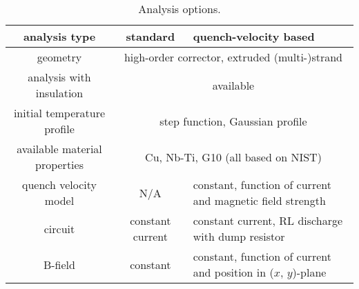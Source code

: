 \begin{table}[H]
    \caption{Analysis options.} 
    \vspace{-1.em} 
    \fontsize{10}{10}
    \selectfont 
    \renewcommand{\arraystretch}{1.5}
    \begin{center}
        \begin{tabular}{ | c | c | m{5cm} | }  
        \hline
        \textbf{analysis type} & \textbf{standard} & \textbf{quench-velocity based} \\
        \hline
        geometry & \multicolumn{2}{c|}{high-order corrector, extruded (multi-)strand} \\
        \hline
        analysis with insulation & \multicolumn{2}{c|}{available} \\
        \hline
        initial temperature profile & \multicolumn{2}{c|}{step function, Gaussian profile} \\
        \hline
        available material properties & \multicolumn{2}{c|}{Cu, Nb-Ti, G10 (all based on NIST)} \\
        \hline
        quench velocity model & N/A & constant, function of current and magnetic field strength \\
        \hline
        circuit & constant current & constant current, RL discharge with dump resistor \\ 
        \hline
        B-field & constant & constant, function of current and position in ($x$, $y$)-plane \\
        \hline
        \end{tabular}
    \end{center}  
     \label{table:python_analysis_options} 
 \end{table}

